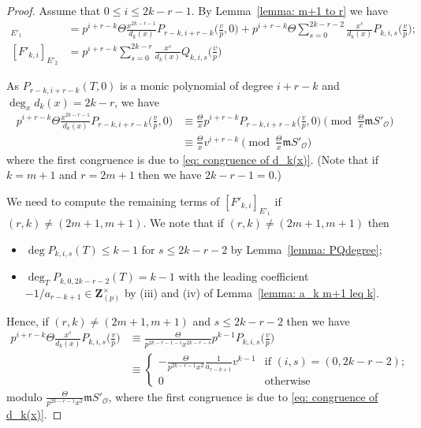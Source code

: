 \documentclass[11pt]{amsart}
\theoremstyle{definition}
\numberwithin{equation}{subsection}
\theoremstyle{plain}
\theoremstyle{plain}
\theoremstyle{plain}
\theoremstyle{plain}
\theoremstyle{plain}
\theoremstyle{plain}
\theoremstyle{plain}
\theoremstyle{plain}
\theoremstyle{plain}
\theoremstyle{plain}
\theoremstyle{plain}
\theoremstyle{plain}
\theoremstyle{definition}
\theoremstyle{definition}
\theoremstyle{definition}
\theoremstyle{remark}
\renewcommand{\(}{\textup{(}}
\renewcommand{\)}{\textup{)}}
\newcommand{\Z}{\mathbf{Z}}
\newcommand{\fm}{\mathfrak{m}}
\newcommand{\cO}{\mathcal{O}}
\begin{document}
\begin{proof}
Assume that $0\leq i\leq 2k-r-1$. By Lemma~\ref{lemma: m+1 to r} we have
\begin{align*}
[F'_{k,i}]_{E'_1}&=
    p^{i+r-k}\Theta\frac{x^{2k-r-1}}{d_k(x)}P_{r-k,i+r-k}\Big(\frac{v}{p},0\Big)
    +p^{i+r-k}\Theta\sum_{s=0}^{2k-r-2}\frac{x^s}{d_k(x)} P_{k,i,s}\Big(\frac{v}{p}\Big);\\
[F'_{k,i}]_{E'_2}&=p^{i+r-k}\sum_{s=0}^{2k-r}
    \frac{x^s}{d_k(x)} Q_{k,i,s}\Big(\frac{v}{p}\Big)
\end{align*}



As $P_{r-k,i+r-k}(T,0)$ is a monic polynomial of degree $i+r-k$ and $\deg_xd_k(x)=2k-r$, we have
\begin{align*}
    p^{i+r-k}\Theta\frac{x^{2k-r-1}}{d_k(x)}P_{r-k,i+r-k}\Big(\frac{v}{p},0\Big)
    &\equiv
    \frac{\Theta}{x}p^{i+r-k}P_{r-k,i+r-k}\Big(\frac{v}{p},0\Big)\pmod{\frac{\Theta}{x}\fm S'_\cO}\\
    &\equiv \frac{\Theta}{x}v^{i+r-k} \pmod{\frac{\Theta}{x}\fm S'_\cO}
\end{align*}
where the first congruence is due to \eqref{eq: congruence of d_k(x)}. (Note that if $k=m+1$ and $r=2m+1$ then we have $2k-r-1=0$.)


We need to compute the remaining terms of $[F'_{k,i}]_{E'_1}$ if $(r,k)\neq(2m+1,m+1)$. We note that if $(r,k)\neq(2m+1,m+1)$ then
\begin{itemize}[leftmargin=*]
  \item $\deg P_{k,i,s}(T)\leq k-1$ for $s\leq 2k-r-2$ by Lemma~\ref{lemma: PQdegree};
  \item $\deg_TP_{k,0,2k-r-2}(T)=k-1$ with the leading coefficient $-1/a_{r-k+1}\in\Z_{(p)}^\times$ by (iii) and (iv) of  Lemma~\ref{lemma: a_k m+1 leq k}.
\end{itemize}
Hence, if $(r,k)\neq (2m+1,m+1)$ and $s\leq 2k-r-2$ then we have
\begin{align*}
    p^{i+r-k}\Theta\frac{x^s}{d_k(x)} P_{k,i,s}\Big(\frac{v}{p}\Big)
    &\equiv
    \frac{\Theta}{p^{2k-r-1-i}x^{2k-r-s}} p^{k-1} P_{k,i,s}\Big(\frac{v}{p}\Big)\\
    &\equiv
    \begin{cases}
        -\frac{\Theta}{p^{2k-r-1}x^2}\frac{1}{a_{r-k+1}}v^{k-1}
         & \mbox{if } (i,s)=(0,2k-r-2);\\
        0 & \mbox{otherwise}
    \end{cases}
\end{align*}
modulo $\frac{\Theta}{p^{2k-r-1}x^2}\fm S'_\cO$, where the first congruence is due to \eqref{eq: congruence of d_k(x)}.





\end{proof}
\end{document}
